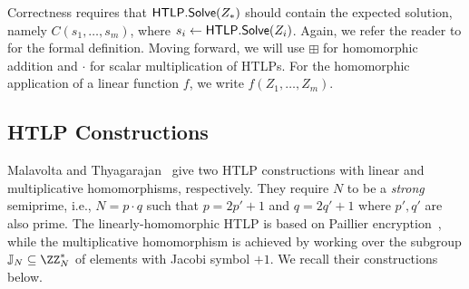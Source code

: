 Correctness requires that $\mathsf{HTLP}.{\sf Solve}(Z_*)$
should contain the expected solution, namely $C(s_1, \dots, s_m)$, where $s_i \gets \mathsf{HTLP}.{\sf Solve}(Z_i)$. Again, we refer the reader to \cite{C:MalThy19} for the formal definition. Moving forward, we will use $\boxplus$ for homomorphic addition and $\cdot$ for scalar multiplication of HTLPs. For the homomorphic application of a linear function $f$, we write $f(Z_1, \dots, Z_m)$.



\subsection{HTLP Constructions}\label{app:htlp_constructions}

Malavolta and Thyagarajan~\cite{C:MalThy19} give two HTLP constructions with linear and multiplicative homomorphisms, respectively. They require $N$ to be a \emph{strong} semiprime, i.e., $N = p \cdot q$ such that $p = 2p' + 1$ and $q = 2q' + 1$ where $p', q'$ are also prime. The linearly-homomorphic HTLP is based on Paillier encryption~\cite{C:Paillier99}, while the multiplicative homomorphism is achieved by working over the subgroup $\JJ_N \subseteq \ZZ_N^*$ of elements with Jacobi symbol $+1$. 
We recall their constructions below.

